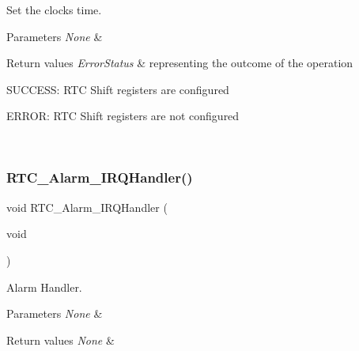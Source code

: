 Set the clock\textquotesingle{}s time. 


\begin{DoxyParams}{Parameters}
{\em None} & \\
\hline
\end{DoxyParams}

\begin{DoxyRetVals}{Return values}
{\em Error\+Status} & representing the outcome of the operation
\begin{DoxyItemize}
\item S\+U\+C\+C\+E\+SS\+: R\+TC Shift registers are configured
\item E\+R\+R\+OR\+: R\+TC Shift registers are not configured 
\end{DoxyItemize}\\
\hline
\end{DoxyRetVals}
\mbox{\label{group___clock_ga4da4fb52ec579671d337938e78f9a207}} 
\subsubsection{\texorpdfstring{R\+T\+C\+\_\+\+Alarm\+\_\+\+I\+R\+Q\+Handler()}{RTC\_Alarm\_IRQHandler()}}
{\footnotesize\ttfamily void R\+T\+C\+\_\+\+Alarm\+\_\+\+I\+R\+Q\+Handler (\begin{DoxyParamCaption}\item[{void}]{ }\end{DoxyParamCaption})}



Alarm Handler. 


\begin{DoxyParams}{Parameters}
{\em None} & \\
\hline
\end{DoxyParams}

\begin{DoxyRetVals}{Return values}
{\em None} & \\
\hline
\end{DoxyRetVals}
